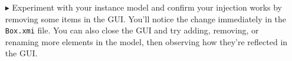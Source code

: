 \begin{itemize}
\vspace{1cm}

\item[$\blacktriangleright$] Experiment with your instance model and confirm your injection works by removing some items in the GUI.  You'll notice the change
immediately in the \texttt{Box.xmi} file. You can also close the GUI and try adding, removing, or renaming more elements in the model, then observing
how they're reflected in the GUI.


\end{itemize}
